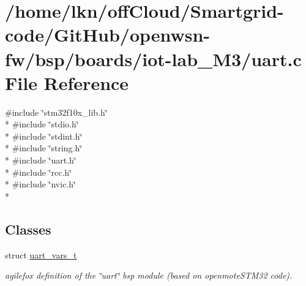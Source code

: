 \hypertarget{iot-lab___m3_2uart_8c}{}\section{/home/lkn/off\+Cloud/\+Smartgrid-\/code/\+Git\+Hub/openwsn-\/fw/bsp/boards/iot-\/lab\+\_\+\+M3/uart.c File Reference}
\label{iot-lab___m3_2uart_8c}
{\ttfamily \#include \char`\"{}stm32f10x\+\_\+lib.\+h\char`\"{}}\\*
{\ttfamily \#include \char`\"{}stdio.\+h\char`\"{}}\\*
{\ttfamily \#include \char`\"{}stdint.\+h\char`\"{}}\\*
{\ttfamily \#include \char`\"{}string.\+h\char`\"{}}\\*
{\ttfamily \#include \char`\"{}uart.\+h\char`\"{}}\\*
{\ttfamily \#include \char`\"{}rcc.\+h\char`\"{}}\\*
{\ttfamily \#include \char`\"{}nvic.\+h\char`\"{}}\\*
\subsection*{Classes}
\begin{DoxyCompactItemize}
\item 
struct \hyperlink{structuart__vars__t}{uart\+\_\+vars\+\_\+t}
\begin{DoxyCompactList}\small\item\em agilefox definition of the \char`\"{}uart\char`\"{} bsp module (based on openmote\+S\+T\+M32 code). \end{DoxyCompactList}\end{DoxyCompactItemize}
